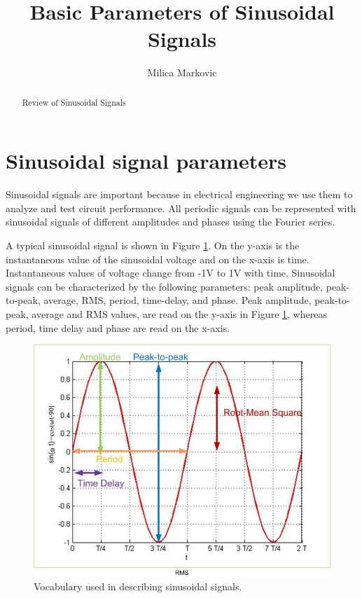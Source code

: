 \documentclass{ximera}
\title{Basic Parameters of Sinusoidal Signals}
\author{Milica Markovic}
\begin{document}
  
\begin{abstract}  
Review of Sinusoidal Signals
\end{abstract}  
\maketitle

\section{Sinusoidal signal parameters}

Sinusoidal signals are important because in electrical engineering we use them to analyze and test circuit performance. All periodic signals can be represented with sinusoidal signals of different amplitudes and phases using the Fourier series. 

A typical sinusoidal signal is shown in Figure \ref{sinusoid}. On the y-axis is the instantaneous value of the sinusoidal voltage and on the x-axis is time. Instantaneous values of voltage change from -1V to 1V with time. Sinusoidal signals can be characterized by the following parameters: peak amplitude, peak-to-peak, average, RMS, period, time-delay, and phase. Peak amplitude, peak-to-peak, average and RMS values, are read on the y-axis in Figure \ref{sinusoid}, whereas period, time delay and phase are read on the x-axis.

\begin{figure}[htbp]
\begin{center}
\includegraphics[scale=0.4]{jpg/sinusoid.jpg}
\caption{Vocabulary used in describing sinusoidal signals.}
\label{sinusoid}
\end{center}
\end{figure} 
\end{document}

